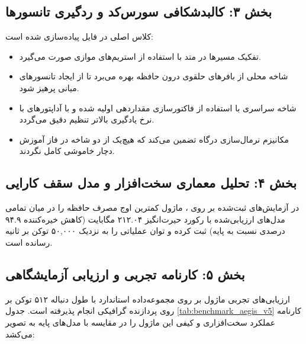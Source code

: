 \subsection*{بخش ۳: کالبدشکافی سورس‌کد و ردگیری تانسورها }
کلاس اصلی  در فایل  پیاده‌سازی شده است:
\begin{itemize}
    \item تفکیک مسیرها در متد  با استفاده از استریم‌های موازی صورت می‌گیرد.
    \item شاخه محلی از بافرهای حلقوی درون حافظه بهره می‌برد تا از ایجاد تانسورهای میانی پرهیز شود.
    \item شاخه سراسری با استفاده از فاکتورسازی  مقداردهی اولیه شده و با آداپتورهای  با نرخ یادگیری بالاتر تنظیم دقیق می‌گردد.
    \item مکانیزم نرمال‌سازی درگاه تضمین می‌کند که هیچ‌یک از دو شاخه در فاز آموزش دچار خاموشی کامل نگردند.
\end{itemize}

\subsection*{بخش ۴: تحلیل معماری سخت‌افزار و مدل سقف کارایی }
در آزمایش‌های ثبت‌شده بر روی ، ماژول  کمترین اوج مصرف حافظه را در میان تمامی مدل‌های ارزیابی‌شده با رکورد حیرت‌انگیز ۲۱۲.۰۴ مگابایت (کاهش خیره‌کننده ۹۴.۹ درصدی نسبت به پایه) ثبت کرده و توان عملیاتی را به نزدیک ۵۰,۰۰۰ توکن بر ثانیه رسانده است.

\subsection*{بخش ۵: کارنامه تجربی و ارزیابی آزمایشگاهی }
ارزیابی‌های تجربی ماژول  بر روی مجموعه‌داده استاندارد  با طول دنباله ۵۱۲ توکن بر روی پردازنده گرافیکی  انجام پذیرفته است. جدول \ref{tab:benchmark_aegis_v5} کارنامه عملکرد سخت‌افزاری و کیفی این ماژول را در مقایسه با مدل‌های پایه به تصویر می‌کشد:

